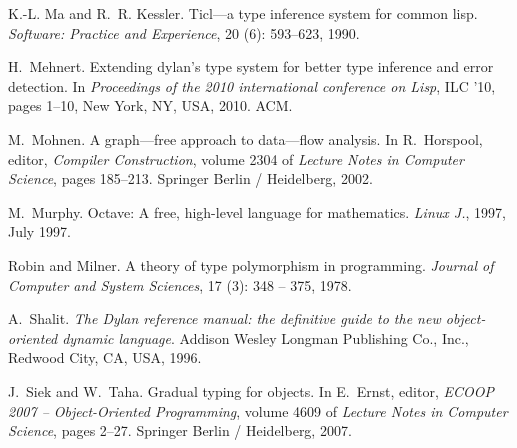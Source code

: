 \documentclass[9pt]{sigplanconf}
\begin{document}
\begin{thebibliography}{42}
K.-L. Ma and R.~R. Kessler.
\newblock Ticl—a type inference system for common lisp.
\newblock \emph{Software: Practice and Experience}, 20 (6):
  593--623, 1990.

H.~Mehnert.
\newblock Extending dylan's type system for better type inference and error
  detection.
\newblock In \emph{Proceedings of the 2010 international conference on Lisp},
  ILC '10, pages 1--10, New York, NY, USA, 2010. ACM.

M.~Mohnen.
\newblock A graph—free approach to data—flow analysis.
\newblock In R.~Horspool, editor, \emph{Compiler Construction}, volume 2304 of
  \emph{Lecture Notes in Computer Science}, pages 185--213. Springer Berlin /
  Heidelberg, 2002.

M.~Murphy.
\newblock Octave: A free, high-level language for mathematics.
\newblock \emph{Linux J.}, 1997, July 1997.

Robin and Milner.
\newblock A theory of type polymorphism in programming.
\newblock \emph{Journal of Computer and System Sciences}, 17
  (3): 348 -- 375, 1978.

A.~Shalit.
\newblock \emph{The Dylan reference manual: the definitive guide to the new
  object-oriented dynamic language}.
\newblock Addison Wesley Longman Publishing Co., Inc., Redwood City, CA, USA,
  1996.

J.~Siek and W.~Taha.
\newblock Gradual typing for objects.
\newblock In E.~Ernst, editor, \emph{ECOOP 2007 – Object-Oriented
  Programming}, volume 4609 of \emph{Lecture Notes in Computer Science}, pages
  2--27. Springer Berlin / Heidelberg, 2007.


\end{thebibliography}
\end{document}
